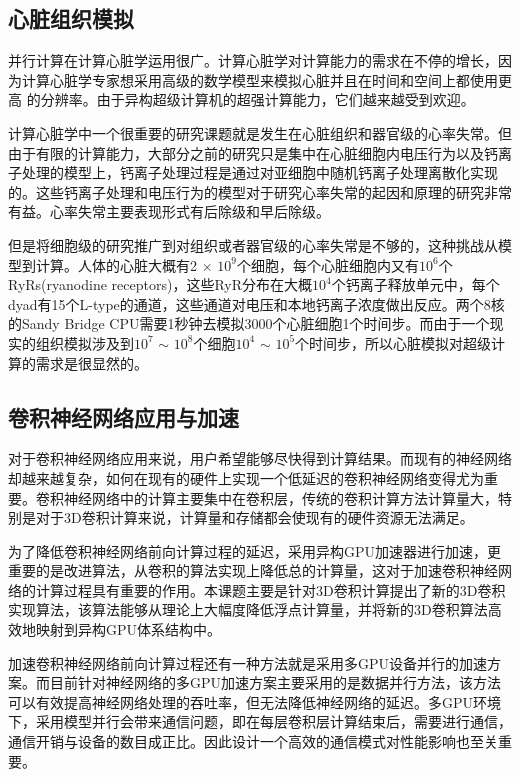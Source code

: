 \subsection{心脏组织模拟}
并行计算在计算心脏学运用很广。计算心脏学对计算能力的需求在不停的增长，因为计算心脏学专家想采用高级的数学模型来模拟心脏并且在时间和空间上都使用更高 的分辨率。由于异构超级计算机的超强计算能力，它们越来越受到欢迎。

计算心脏学中一个很重要的研究课题就是发生在心脏组织和器官级的心率失常。但由于有限的计算能力，大部分之前的研究只是集中在心脏细胞内电压行为以及钙离子处理的模型上，钙离子处理过程是通过对亚细胞中随机钙离子处理离散化实现的。这些钙离子处理和电压行为的模型对于研究心率失常的起因和原理的研究非常有益。心率失常主要表现形式有后除级和早后除级。

但是将细胞级的研究推广到对组织或者器官级的心率失常是不够的，这种挑战从模型到计算。人体的心脏大概有2 $\times$ $10^9$个细胞，每个心脏细胞内又有$10^6$个RyRs(ryanodine receptors)，这些RyR分布在大概$10^4$个钙离子释放单元中，每个dyad有15个L-type的通道，这些通道对电压和本地钙离子浓度做出反应。两个8核的Sandy Bridge CPU需要1秒钟去模拟3000个心脏细胞1个时间步。而由于一个现实的组织模拟涉及到$10^7$ $\sim$ $10^8$个细胞$10^4$ $\sim$ $10^5$个时间步，所以心脏模拟对超级计算的需求是很显然的。

\subsection{卷积神经网络应用与加速}
对于卷积神经网络应用来说，用户希望能够尽快得到计算结果。而现有的神经网络却越来越复杂，如何在现有的硬件上实现一个低延迟的卷积神经网络变得尤为重要。卷积神经网络中的计算主要集中在卷积层，传统的卷积计算方法计算量大，特别是对于3D卷积计算来说，计算量和存储都会使现有的硬件资源无法满足。

为了降低卷积神经网络前向计算过程的延迟，采用异构GPU加速器进行加速，更重要的是改进算法，从卷积的算法实现上降低总的计算量，这对于加速卷积神经网络的计算过程具有重要的作用。本课题主要是针对3D卷积计算提出了新的3D卷积实现算法，该算法能够从理论上大幅度降低浮点计算量，并将新的3D卷积算法高效地映射到异构GPU体系结构中。

加速卷积神经网络前向计算过程还有一种方法就是采用多GPU设备并行的加速方案。而目前针对神经网络的多GPU加速方案主要采用的是数据并行方法，该方法可以有效提高神经网络处理的吞吐率，但无法降低神经网络的延迟。多GPU环境下，采用模型并行会带来通信问题，即在每层卷积层计算结束后，需要进行通信，通信开销与设备的数目成正比。因此设计一个高效的通信模式对性能影响也至关重要。

